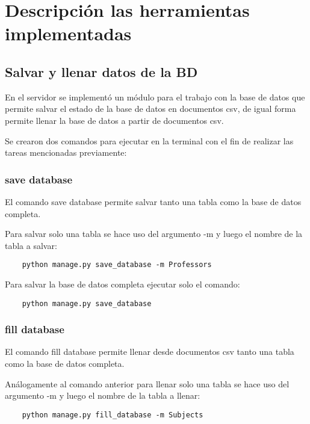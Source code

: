 \chapter{Descripción las herramientas implementadas}\label{chapter:implementation}


\section{Salvar y llenar datos de la BD}

En el servidor se implementó un módulo para el trabajo con la base de datos que permite salvar el estado de la base de datos en documentos csv, de igual forma permite llenar la base de datos a partir de documentos csv.

Se crearon dos comandos para ejecutar en la terminal con el fin de realizar las tareas mencionadas previamente:

\subsection{save database}

El comando save database permite salvar tanto 
una tabla como la base de datos completa.

Para salvar solo una tabla se hace uso del 
argumento -m y luego el nombre de la 
tabla a salvar:

\begin{verbatim}
    python manage.py save_database -m Professors
\end{verbatim}


Para salvar la base de datos completa ejecutar 
solo el comando:

\begin{verbatim}
    python manage.py save_database
\end{verbatim}


\subsection{fill database}
El comando fill database permite llenar desde 
documentos csv tanto una tabla como la base de 
datos completa.

Análogamente al comando anterior para llenar solo una tabla se hace uso del argumento -m y luego el nombre de la tabla a llenar:

\begin{verbatim}
    python manage.py fill_database -m Subjects
\end{verbatim}


